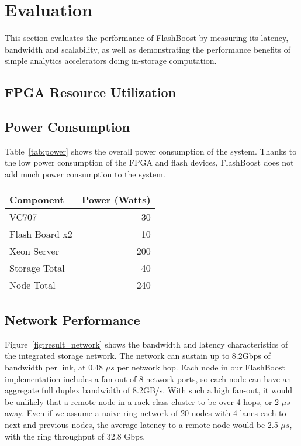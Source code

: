 \section{Evaluation}
\label{sec:results}

This section evaluates the performance of FlashBoost by measuring its latency,
bandwidth and scalability, as well as demonstrating the performance benefits of
simple analytics accelerators doing in-storage computation.

\subsection{FPGA Resource Utilization}

\subsection{Power Consumption}
Table~\ref{tab:power} shows the overall power consumption of the system. Thanks
to the low power consumption of the FPGA and flash devices, FlashBoost does not
add much power consumption to the system.

\begin{tabular}{l | r}
\label{tab:power}
Component & Power (Watts) \\
\hline \hline
VC707 & 30 \\
Flash Board x2 & 10 \\
Xeon Server & 200 \\
\hline
Storage Total & 40 \\
Node Total & 240 \\

\end{tabular}

\subsection{Network Performance}

Figure~\ref{fig:result_network} shows the bandwidth and latency characteristics
of the integrated storage network. The network can sustain up to 8.2Gbps of
bandwidth per link, at 0.48 $\mu s$ per network hop. Each node in our FlashBoost
implementation includes a fan-out of 8 network ports, so each node can have an
aggregate full duplex bandwidth of 8.2GB/s. With such a high fan-out, it would
be unlikely that a remote node in a rack-class cluster to be over 4 hops, or 2
$\mu s$ away. Even if we assume a naive ring network of 20 nodes with 4 lanes
each to next and previous nodes, the average latency to a remote node would be
2.5 $\mu s$, with the ring throughput of 32.8 Gbps.

